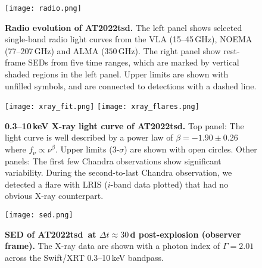 \documentclass{nature_plusfigure}
\newcommand{\at}{AT2022tsd}
\begin{document}
\begin{extended_data}
\begin{figure}[!ht]
 \centering
\texttt{[image: radio.png]}
  \caption{\textbf{Radio evolution of \at.} The left panel shows selected single-band radio light curves from the VLA (15--45\,GHz), NOEMA (77--207\,GHz) and ALMA ($350$\,GHz). The right panel show rest-frame SEDs from five time ranges, which are marked by vertical shaded regions in the left panel. Upper limits are shown with unfilled symbols, and are connected to detections with a dashed line.}
 \label{fig:radio}
\end{figure}

\begin{figure}[!ht]
 \centering
\texttt{[image: xray\_fit.png]}
\texttt{[image: xray\_flares.png]}
  \caption{\textbf{0.3--10\,keV X-ray light curve of \at.} Top panel: The light curve is well described by a power law of $\beta=-1.90\pm0.26$ where $f_\nu \propto \nu^{\beta}$. Upper limits (3-$\sigma$) are shown with open circles. Other panels: The first few Chandra observations show significant variability. During the second-to-last Chandra observation, we detected a flare with LRIS ($i$-band data plotted) that had no obvious X-ray counterpart.}
 \label{fig:xray-lc}
\end{figure}


\begin{figure}[!ht]
 \centering
\texttt{[image: sed.png]}
  \caption{\textbf{SED of \at\ at $\Delta t\approx30\,$d post-explosion (observer frame).} The X-ray data are shown with a photon index of $\Gamma=2.01$ across the Swift/XRT 0.3--10\,keV bandpass.}
 \label{fig:full-sed}
\end{figure}


\end{extended_data}
\end{document}
